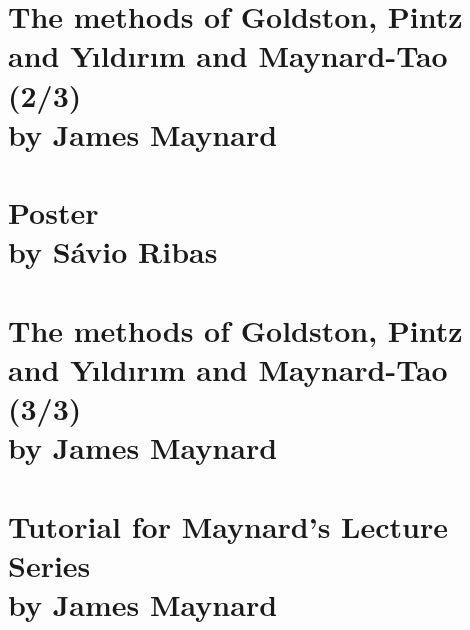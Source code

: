 \documentclass[12pt,amsfont]{amsart}
\begin{document}
\newpage
\renewcommand{\thesubsection}{\arabic{section}.\arabic{subsection}}
\section{The methods of Goldston, Pintz and Y{\i}ld{\i}r{\i}m and Maynard-Tao (2/3)\\by James Maynard}\label{19}

\newpage
\renewcommand{\thesubsection}{\arabic{section}.\arabic{subsection}}
\section{Poster \\by S\'{a}vio Ribas}\label{20}


\newpage
\renewcommand{\thesubsection}{\arabic{section}.\arabic{subsection}}
\section{The methods of Goldston, Pintz and Y{\i}ld{\i}r{\i}m and Maynard-Tao (3/3)\\by James Maynard}\label{21}

\newpage
\renewcommand{\thesubsection}{\arabic{section}.\arabic{subsection}}
\section{Tutorial for Maynard's Lecture Series\\ by James Maynard}\label{22}
\end{document}
